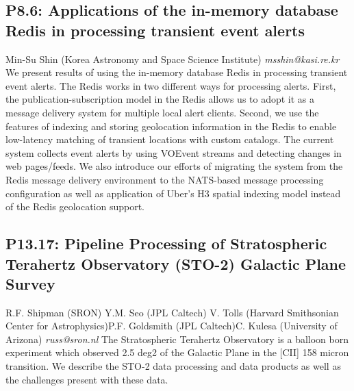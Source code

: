 \documentclass{report}
\begin{document}
\subsection*{P8.6: Applications of the in-memory database Redis in processing transient event alerts}
\bigskip
Min-Su Shin (Korea Astronomy and Space Science Institute) \newline   \newline   \newline   \newline  \newline  \newline\newline
{\it msshin@kasi.re.kr}\newline
\newline\newline
We present results of using the in-memory database Redis in processing transient event alerts. The Redis works in two different ways for processing alerts. First, the publication-subscription model in the Redis allows us to adopt it as a message delivery system for multiple local alert clients. Second, we use the features of indexing and storing geolocation information in the Redis to enable low-latency matching of transient locations with custom catalogs. The current system collects event alerts by using VOEvent streams and detecting changes in web pages/feeds. We also introduce our efforts of migrating the system from the Redis message delivery environment to the NATS-based message processing configuration as well as application of Uber's H3 spatial indexing model instead of the Redis geolocation support.\newline
\newpage
\subsection*{P13.17: Pipeline Processing of Stratospheric Terahertz Observatory (STO-2) Galactic Plane Survey}
\bigskip
R.F. Shipman (SRON) \newline Y.M. Seo (JPL Caltech) \newline  V. Tolls (Harvard Smithsonian Center for Astrophysics)\newline  P.F. Goldsmith (JPL Caltech)\newline C. Kulesa (University of Arizona)\newline  \newline\newline
{\it russ@sron.nl}\newline
\newline\newline
The Stratospheric Terahertz Observatory is a balloon born experiment which observed 2.5 deg2 of the Galactic Plane in the [CII] 158 micron transition.  We describe the STO-2 data processing and data products as well as the challenges present with these data.\newline
\newpage
\end{document}
